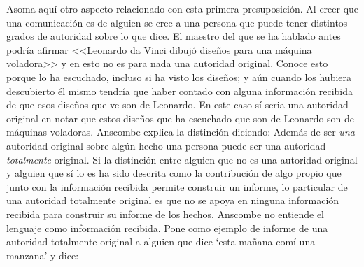 Asoma aquí otro aspecto relacionado con esta primera presuposición. Al creer que
una comunicación es de alguien se cree a una persona que puede tener distintos
grados de autoridad sobre lo que dice. El maestro del que se ha hablado antes
podría afirmar <<Leonardo da Vinci dibujó diseños para una máquina voladora>> y
en esto no es para nada una autoridad
original\autocite[Cf.~][6]{anscombe2008faith:tobelieve}. Conoce esto porque lo
ha escuchado, incluso si ha visto los diseños; y aún cuando los hubiera
descubierto él mismo tendría que haber contado con alguna información recibida
de que esos diseños que ve son de Leonardo. En este caso sí seria una autoridad
original en notar que estos diseños que ha escuchado que son de Leonardo son de
máquinas voladoras. Anscombe explica la distinción diciendo:
 Además de ser
\emph{una} autoridad original sobre algún hecho una persona puede ser una
autoridad \emph{totalmente} original. Si la distinción entre alguien que no es
una autoridad original y alguien que sí lo es ha sido descrita como la
contribución de algo propio que junto con la información recibida permite
construir un informe, lo particular de una autoridad totalmente original es que
no se apoya en ninguna información recibida para construir su informe de los
hechos. Anscombe no entiende el lenguaje como información recibida. Pone como
ejemplo de informe de una autoridad totalmente original a alguien que dice `esta
mañana comí una manzana' y dice: 
